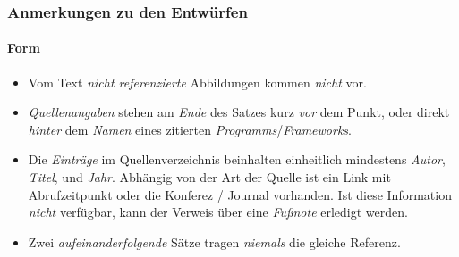 \documentclass{i20lecture}
\begin{document}
\begin{frame}
  \frametitle{Anmerkungen zu den Entwürfen}
  \framesubtitle{Form}

  \begin{itemize}
    \item Vom Text \emph{nicht referenzierte} Abbildungen kommen \emph{nicht} vor.
    
    \item \emph{Quellenangaben} stehen am \emph{Ende} des Satzes kurz \emph{vor} dem Punkt, oder direkt
    \emph{hinter} dem \emph{Namen} eines zitierten \emph{Programms}/\emph{Frameworks}.
    
    \item Die \emph{Einträge} im Quellenverzeichnis beinhalten einheitlich mindestens \emph{Autor}, \emph{Titel}, und
    \emph{Jahr}. Abhängig von der Art der Quelle ist ein Link mit Abrufzeitpunkt oder die
    Konferez / Journal vorhanden. Ist diese Information \emph{nicht} verfügbar, kann der
    Verweis über eine \emph{Fußnote} erledigt werden.

    \item Zwei \emph{aufeinanderfolgende} Sätze tragen \emph{niemals} die gleiche Referenz.

  \end{itemize}
\end{frame}
\end{document}
